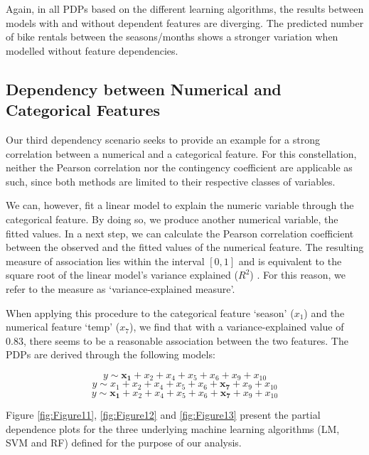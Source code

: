 \documentclass[]{krantz}
\begin{document}
Again, in all PDPs based on the different learning algorithms, the
results between models with and without dependent features are
diverging. The predicted number of bike rentals between the
seasons/months shows a stronger variation when modelled without feature
dependencies.

\subsection{Dependency between Numerical and Categorical
Features}\label{NumCat}

Our third dependency scenario seeks to provide an example for a strong
correlation between a numerical and a categorical feature. For this
constellation, neither the Pearson correlation nor the contingency
coefficient are applicable as such, since both methods are limited to
their respective classes of variables.

We can, however, fit a linear model to explain the numeric variable
through the categorical feature. By doing so, we produce another
numerical variable, the fitted values. In a next step, we can calculate
the Pearson correlation coefficient between the observed and the fitted
values of the numerical feature. The resulting measure of association
lies within the interval \([0,1]\) and is equivalent to the square root
of the linear model's variance explained (\(R^2\))
\citep{fahrmeir2013regression}. For this reason, we refer to the measure
as `variance-explained measure'.

When applying this procedure to the categorical feature `season'
(\(x_1\)) and the numerical feature `temp' (\(x_7\)), we find that with
a variance-explained value of 0.83, there seems to be a reasonable
association between the two features. The PDPs are derived through the
following models:

\begin{equation}
y \sim \mathbf{x_1} + x_2 + x_4 + x_5 + x_6 + x_9 + x_{10} \label{eq:7}
\end{equation}\begin{equation}
y \sim x_1 + x_2 + x_4 + x_5 + x_6 + \mathbf{x_7}+ x_9 + x_{10} \label{eq:8}
\end{equation}\begin{equation}
y \sim \mathbf{x_1} + x_2  + x_4 + x_5 + x_6 +\mathbf{x_7}+ x_9 + x_{10} \label{eq:9}
\end{equation}

Figure \ref{fig:Figure11}, \ref{fig:Figure12} and \ref{fig:Figure13}
present the partial dependence plots for the three underlying machine
learning algorithms (LM, SVM and RF) defined for the purpose of our
analysis.
\end{document}
